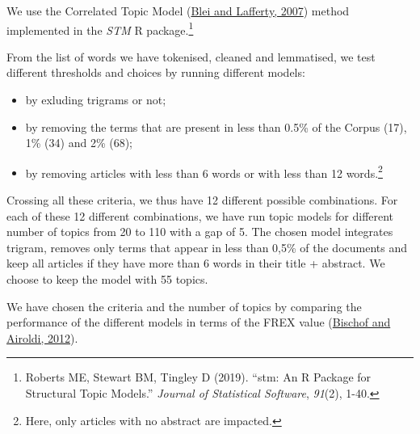 \documentclass[]{elsarticle} %
\providecommand{\tightlist}{%
  \setlength{\itemsep}{0pt}\setlength{\parskip}{0pt}}
\begin{document}
We use the Correlated Topic Model (\protect\hyperlink{ref-blei2007}{Blei
and Lafferty, 2007}) method implemented in the \emph{STM} R
package.\footnote{Roberts ME, Stewart BM, Tingley D (2019). ``stm: An R
  Package for Structural Topic Models.'' \emph{Journal of Statistical
  Software}, \emph{91}(2), 1-40.}

From the list of words we have tokenised, cleaned and lemmatised, we
test different thresholds and choices by running different models:

\begin{itemize}
\tightlist
\item
  by exluding trigrams or not;
\item
  by removing the terms that are present in less than 0.5\% of the
  Corpus (17), 1\% (34) and 2\% (68);
\item
  by removing articles with less than 6 words or with less than 12
  words.\footnote{Here, only articles with no abstract are impacted.}
\end{itemize}

Crossing all these criteria, we thus have 12 different possible
combinations. For each of these 12 different combinations, we have run
topic models for different number of topics from 20 to 110 with a gap of
5. The chosen model integrates trigram, removes only terms that appear
in less than 0,5\% of the documents and keep all articles if they have
more than 6 words in their title + abstract. We choose to keep the model
with 55 topics.

We have chosen the criteria and the number of topics by comparing the
performance of the different models in terms of the FREX value
(\protect\hyperlink{ref-bischof2012}{Bischof and Airoldi, 2012}).
\end{document}
